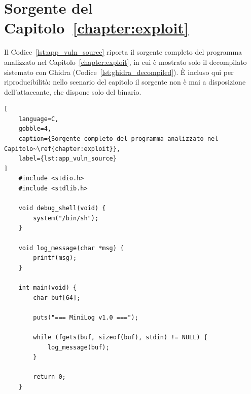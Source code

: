 \section{Sorgente del Capitolo~\ref{chapter:exploit}}\label{sec:app_cap3}
Il Codice~\ref{lst:app_vuln_source} riporta il sorgente completo del programma analizzato nel Capitolo~\ref{chapter:exploit}, in cui è mostrato solo il decompilato sistemato con Ghidra (Codice~\ref{lst:ghidra_decompiled}). È incluso qui per riproducibilità: nello scenario del capitolo il sorgente non è mai a disposizione dell'attaccante, che dispone solo del binario.
\begin{lstlisting}[
    language=C,
    gobble=4,
    caption={Sorgente completo del programma analizzato nel Capitolo~\ref{chapter:exploit}},
    label={lst:app_vuln_source}
]
    #include <stdio.h>
    #include <stdlib.h>

    void debug_shell(void) {
        system("/bin/sh");
    }

    void log_message(char *msg) {
        printf(msg);
    }

    int main(void) {
        char buf[64];

        puts("=== MiniLog v1.0 ===");

        while (fgets(buf, sizeof(buf), stdin) != NULL) {
            log_message(buf);
        }
        
        return 0;
    }
\end{lstlisting}
